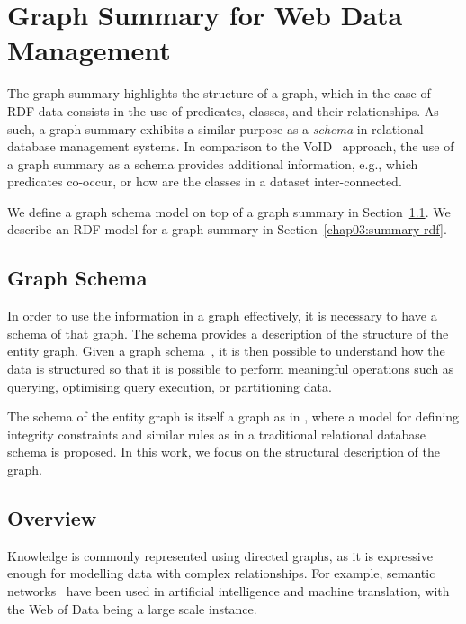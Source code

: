 \section{Graph Summary for Web Data Management}
\label{chap03:sec:wd-mgnt}

The graph summary highlights the structure of a graph, which in the case of RDF data consists in the use of predicates, classes, and their relationships. As such, a graph summary exhibits a similar purpose as a \emph{schema} in relational database management systems. In comparison to the VoID~\cite{alexander:2009:dld} approach, the use of a graph summary as a schema provides additional information, e.g., which predicates co-occur, or how are the classes in a dataset inter-connected.

We define a graph schema model on top of a graph summary in Section~\ref{chap03:sec:gschema}. We describe an RDF model for a graph summary in Section~\ref{chap03:summary-rdf}.

\subsection{Graph Schema}
\label{chap03:sec:gschema}

In order to use the information in a graph effectively, it is necessary to have a schema of that graph. The schema provides a description of the structure of the entity graph. Given a graph schema~\cite{buneman:1997:asu,kunii1983graph}, it is then possible to understand how the data is structured so that it is possible to perform meaningful operations such as querying, optimising query execution, or partitioning data.%

The schema of the entity graph is itself a graph as in \cite{kunii1983graph}, where a model for defining integrity constraints and similar rules as in a traditional relational database schema is proposed. In this work, we focus on the structural description of the graph.%

\subsection{Overview}

Knowledge is commonly represented using directed graphs, as it is expressive enough for modelling data with complex relationships. For example, semantic networks~\cite{quillan:1966:semantic} have been used in artificial intelligence and machine translation, with the Web of Data being a large scale instance.

